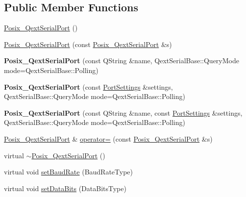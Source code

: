 \subsection*{Public Member Functions}
\begin{DoxyCompactItemize}
\item 
\mbox{\hyperlink{class_posix___qext_serial_port_ae6e0dda91cd654352c26686e88a416ff}{Posix\+\_\+\+Qext\+Serial\+Port}} ()
\item 
\mbox{\hyperlink{class_posix___qext_serial_port_ac409b3d891500be663894c9910749390}{Posix\+\_\+\+Qext\+Serial\+Port}} (const \mbox{\hyperlink{class_posix___qext_serial_port}{Posix\+\_\+\+Qext\+Serial\+Port}} \&s)
\item 
\mbox{\label{class_posix___qext_serial_port_a68f82b42c6be8c39476fce07c1ff9099}} 
{\bfseries Posix\+\_\+\+Qext\+Serial\+Port} (const Q\+String \&name, Qext\+Serial\+Base\+::\+Query\+Mode mode=Qext\+Serial\+Base\+::\+Polling)
\item 
\mbox{\label{class_posix___qext_serial_port_ac4b94dd87dbd1dcebb90e8cb368681bb}} 
{\bfseries Posix\+\_\+\+Qext\+Serial\+Port} (const \mbox{\hyperlink{struct_port_settings}{Port\+Settings}} \&settings, Qext\+Serial\+Base\+::\+Query\+Mode mode=Qext\+Serial\+Base\+::\+Polling)
\item 
\mbox{\label{class_posix___qext_serial_port_a0de9ecc15cedbe6713ea2da1ce135e9c}} 
{\bfseries Posix\+\_\+\+Qext\+Serial\+Port} (const Q\+String \&name, const \mbox{\hyperlink{struct_port_settings}{Port\+Settings}} \&settings, Qext\+Serial\+Base\+::\+Query\+Mode mode=Qext\+Serial\+Base\+::\+Polling)
\item 
\mbox{\hyperlink{class_posix___qext_serial_port}{Posix\+\_\+\+Qext\+Serial\+Port}} \& \mbox{\hyperlink{class_posix___qext_serial_port_ae02031d657490ab37d5badf42482847a}{operator=}} (const \mbox{\hyperlink{class_posix___qext_serial_port}{Posix\+\_\+\+Qext\+Serial\+Port}} \&s)
\item 
virtual \mbox{\hyperlink{class_posix___qext_serial_port_a12f6cdddbfd1b37109a39a0bcffb446d}{$\sim$\+Posix\+\_\+\+Qext\+Serial\+Port}} ()
\item 
virtual void \mbox{\hyperlink{class_posix___qext_serial_port_a007fcdd90f1137b010b6c43aa5b6dc6e}{set\+Baud\+Rate}} (Baud\+Rate\+Type)
\item 
virtual void \mbox{\hyperlink{class_posix___qext_serial_port_a8f428dad3c4ec2fa8128397628c7e5d1}{set\+Data\+Bits}} (Data\+Bits\+Type)

\end{DoxyCompactItemize}
